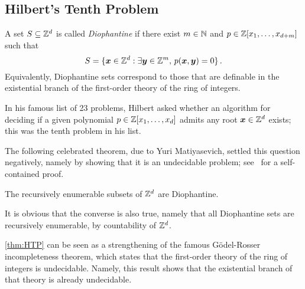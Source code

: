 \subsection{Hilbert's Tenth Problem}

A set $S \subseteq \mathbb{Z}^{d}$ is called \emph{Diophantine} if there exist $m \in \mathbb{N}$ and $p \in \mathbb{Z}[x_{1}, \ldots, x_{d+m}]$ such that
\[ S = \lbrace \boldsymbol{x} \in \mathbb{Z}^{d} : \exists \boldsymbol{y} \in \mathbb{Z}^{m}, \, p(\boldsymbol{x}, \boldsymbol{y}) = 0 \rbrace \, . \]
Equivalently, Diophantine sets correspond to those that are definable in the existential branch of the first-order theory of the ring of integers.

In his famous list of 23 problems, Hilbert asked whether an algorithm for deciding if a given polynomial $p \in \mathbb{Z}[x_{1}, \ldots, x_{d}]$ admits any root $\boldsymbol{x} \in \mathbb{Z}^{d}$ exists; this was the tenth problem in his list.

The following celebrated theorem, due to Yuri Matiyasevich, settled this question negatively, namely by showing that it is an undecidable problem; see~\cite{HTP} for a self-contained proof.

\begin{theorem}[Matiyasevich]
\label{thm:HTP}
The recursively enumerable subsets of $\mathbb{Z}^{d}$ are Diophantine.
\end{theorem}

It is obvious that the converse is also true, namely that all Diophantine sets are recursively enumerable, by countability of $\mathbb{Z}^{d}$.

\cref{thm:HTP} can be seen as a strengthening of the famous G\"{o}del-Rosser incompleteness theorem, which states that the first-order theory of the ring of integers is undecidable. Namely, this result shows that the existential branch of that theory is already undecidable.
